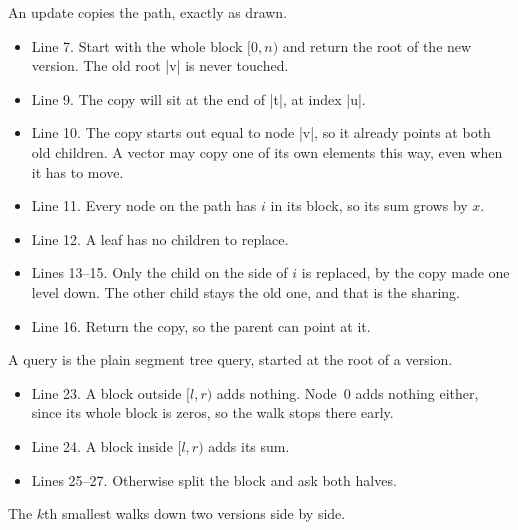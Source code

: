 An update copies the path, exactly as drawn.


\begin{notes}
\begin{itemize}
\item Line 7. Start with the whole block \([0, n)\) and return the root of the new version. The old root \code|v| is never touched.
\item Line 9. The copy will sit at the end of \code|t|, at index \code|u|.
\item Line 10. The copy starts out equal to node \code|v|, so it already points at both old children. A vector may copy one of its own elements this way, even when it has to move.
\item Line 11. Every node on the path has \(i\) in its block, so its sum grows by \(x\).
\item Line 12. A leaf has no children to replace.
\item Lines 13--15. Only the child on the side of \(i\) is replaced, by the copy made one level down. The other child stays the old one, and that is the sharing.
\item Line 16. Return the copy, so the parent can point at it.
\end{itemize}
\end{notes}

A query is the plain segment tree query, started at the root of a version.


\begin{notes}
\begin{itemize}
\item Line 23. A block outside \([l, r)\) adds nothing. Node~0 adds nothing either, since its whole block is zeros, so the walk stops there early.
\item Line 24. A block inside \([l, r)\) adds its sum.
\item Lines 25--27. Otherwise split the block and ask both halves.
\end{itemize}
\end{notes}

The \(k\)th smallest walks down two versions side by side.


